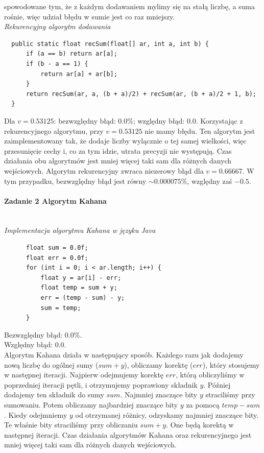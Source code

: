 \documentclass[12pt,a4paper]{article}
\begin{document}
  spowodowane tym, że z każdym dodawaniem mylimy się na stałą liczbę, a suma
  rośnie, więc udział błędu w sumie jest co raz mniejszy.\vspace{3mm}\\
  \emph{Rekurencyjny algorytm dodawania}
  \begin{Verbatim}
  public static float recSum(float[] ar, int a, int b) {
      if (a == b) return ar[a];
      if (b - a == 1) {
          return ar[a] + ar[b];
      }
      return recSum(ar, a, (b + a)/2) + recSum(ar, (b + a)/2 + 1, b);
  }
  \end{Verbatim}
  Dla $v = 0.53125$: \newline
  bezwzględny błąd: $ 0.0 \% $; \newline
  względny błąd: $ 0.0 $. \newline
  Korzystając z rekurencyjnego algorytmu, przy $v = 0.53125$ nie mamy
  błędu. Ten algorytm jest zaimplementowany tak, że dodaje liczby wylącznie o
  tej samej wielkości, więc przesunięcie cechy i, co za tym idzie, utrata
  precyzji nie występują.
  \newline
  Czas działania obu algorytmów jest mniej więcej taki sam dla różnych danych
  wejściowych. \newline
  Algorytm rekurencyjny zwraca niezerowy błąd dla $v = 0.66667$. W tym przypadku,
  bezwzględny błąd jest równy $ \sim 0.000075 \% $, względny zaś $ -0.5 $.
  \paragraph{Zadanie 2 Algorytm Kahana}\mbox{}\vspace{3mm}\\
  \emph{Implementacja algorytmu Kahana w języku Java}
  \begin{Verbatim}
      float sum = 0.0f;
      float err = 0.0f;
      for (int i = 0; i < ar.length; i++) {
          float y = ar[i] - err;
          float temp = sum + y;
          err = (temp - sum) - y;
          sum = temp;
      }
  \end{Verbatim}
  Bezwzględny błąd: $ 0.0 \%$. \\
  Względny błąd: $ 0.0 $. \\
  Algorytm Kahana działa w następujący sposób. Każdego razu jak dodajemy
  nową liczbę do ogólnej sumy ($sum + y$), obliczamy korektę ($err$),
  który stosujemy w następnej iteracji. Najpierw odejmujemy korektę $err$,
  którą obliczyliśmy w poprzedniej iteracji pętli, i otrzymujemy poprawiony
  składnik $y$. Później dodajemy ten składnik do sumy $sum$. Najmniej znaczące
  bity $y$ straciliśmy przy sumowaniu. Potem obliczamy najbardziej znaczące
  bity $y$ za pomocą $temp - sum$. Kiedy odejmniemy $y$ od otrzymanej różnicy,
  odzyskamy najmniej znaczące bity. Te właśnie bity straciliśmy przy obliczaniu
  $sum + y$. One będą korektą w następnej iteracji. \newline
  Czas działania algorytmów Kahana oraz rekurencyjnego jest mniej więcej taki
  sam dla różnych danych wejściowych.
\end{document}
